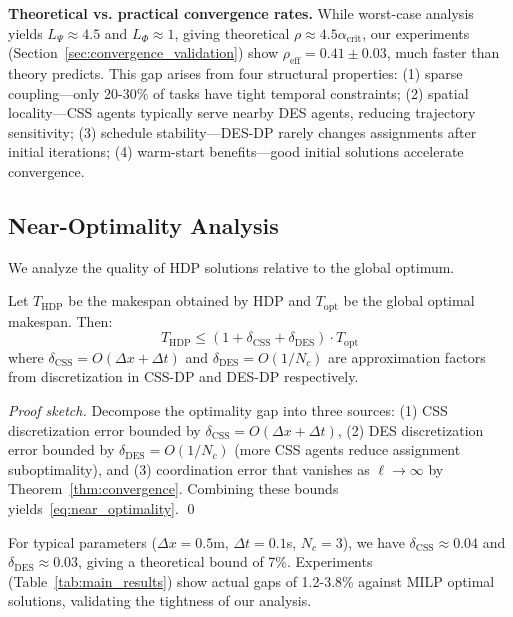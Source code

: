 \documentclass[manuscript,screen,review]{acmart}
\begin{document}
\textbf{Theoretical vs. practical convergence rates.} While worst-case analysis 
yields $L_{\Psi} \approx 4.5$ and $L_{\Phi} \approx 1$, giving theoretical 
$\rho \approx 4.5 \alpha_{\text{crit}}$, our experiments (Section~\ref{sec:convergence_validation}) 
show $\rho_{\text{eff}} = 0.41 \pm 0.03$, much faster than theory predicts. 
This gap arises from four structural properties: (1) sparse coupling—only 
20-30\% of tasks have tight temporal constraints; (2) spatial locality—CSS 
agents typically serve nearby DES agents, reducing trajectory sensitivity; 
(3) schedule stability—DES-DP rarely changes assignments after initial iterations; 
(4) warm-start benefits—good initial solutions accelerate convergence.

\subsection{Near-Optimality Analysis}

We analyze the quality of HDP solutions relative to the global optimum.

\begin{theorem}
Let $T_{\text{HDP}}$ be the makespan obtained by HDP and $T_{\text{opt}}$
be the global optimal makespan. Then:
\begin{equation}
T_{\text{HDP}} \leq (1 + \delta_{\text{CSS}} + \delta_{\text{DES}}) \cdot T_{\text{opt}}
\label{eq:near_optimality}
\end{equation}
where $\delta_{\text{CSS}} = O(\Delta x + \Delta t)$ and $\delta_{\text{DES}} = O(1/N_c)$ are approximation
factors from discretization in CSS-DP and DES-DP respectively.
\label{thm:near_optimality}
\end{theorem}

\begin{proof}[Proof sketch]
Decompose the optimality gap into three sources: (1) CSS discretization error 
bounded by $\delta_{\text{CSS}} = O(\Delta x + \Delta t)$, (2) DES discretization 
error bounded by $\delta_{\text{DES}} = O(1/N_c)$ (more CSS agents reduce 
assignment suboptimality), and (3) coordination error that vanishes as 
$\ell \to \infty$ by Theorem~\ref{thm:convergence}. Combining these bounds 
yields~\eqref{eq:near_optimality}. \qed
\end{proof}

For typical parameters ($\Delta x = 0.5$m, $\Delta t = 0.1$s, $N_c = 3$),
we have $\delta_{\text{CSS}} \approx 0.04$ and $\delta_{\text{DES}} \approx 0.03$,
giving a theoretical bound of 7\%. Experiments (Table~\ref{tab:main_results})
show actual gaps of 1.2-3.8\% against MILP optimal solutions, validating the
tightness of our analysis.
\end{document}
